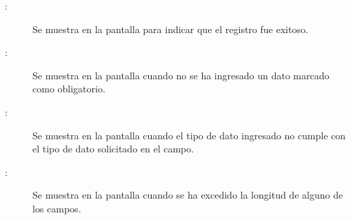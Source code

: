 \begin{description}
	\item[:] Se muestra en la pantalla  para indicar que el registro fue exitoso.
	\item[:] Se muestra en la pantalla  cuando no se ha ingresado un dato marcado como obligatorio.
	\item[:] Se muestra en la pantalla  cuando el tipo de dato ingresado no cumple con el tipo de dato solicitado en el campo.
	\item[:] Se muestra en la pantalla  cuando se ha excedido la longitud de alguno de los campos.
\end{description}
